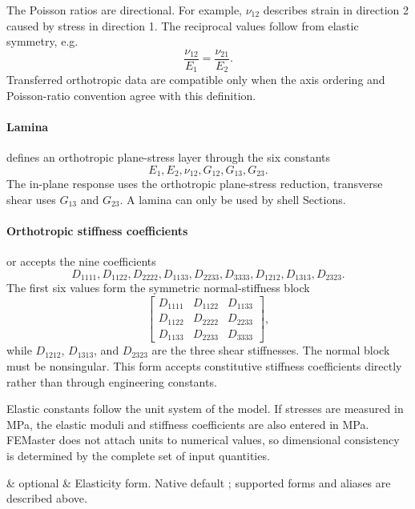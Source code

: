 The Poisson ratios are directional. For example, \(\nu_{12}\) describes strain in direction 2 caused by stress in direction 1. The reciprocal values follow from elastic symmetry, e.g.
\[
\frac{\nu_{12}}{E_1}=\frac{\nu_{21}}{E_2}.
\]
Transferred orthotropic data are compatible only when the axis ordering and Poisson-ratio convention agree with this definition.

\paragraph*{Lamina}

 defines an orthotropic plane-stress layer through the six constants
\[
E_1,E_2,\nu_{12},G_{12},G_{13},G_{23}.
\]
The in-plane response uses the orthotropic plane-stress reduction, transverse shear uses \(G_{13}\) and \(G_{23}\). A lamina can only be used by shell Sections.

\paragraph*{Orthotropic stiffness coefficients}

 or  accepts the nine coefficients
\[
D_{1111},D_{1122},D_{2222},D_{1133},D_{2233},D_{3333},D_{1212},D_{1313},D_{2323}.
\]
The first six values form the symmetric normal-stiffness block
\[
\begin{bmatrix}
D_{1111} & D_{1122} & D_{1133}\\
D_{1122} & D_{2222} & D_{2233}\\
D_{1133} & D_{2233} & D_{3333}
\end{bmatrix},
\]
while \(D_{1212}\), \(D_{1313}\), and \(D_{2323}\) are the three shear stiffnesses. The normal block must be nonsingular. This form accepts constitutive stiffness coefficients directly rather than through engineering constants.

Elastic constants follow the unit system of the model. If stresses are measured in MPa, the elastic moduli and stiffness coefficients are also entered in MPa. FEMaster does not attach units to numerical values, so dimensional consistency is determined by the complete set of input quantities.

\begin{keywordparameters}
 & optional & Elasticity form. Native default ; supported forms and aliases are described above. \\
\end{keywordparameters}

